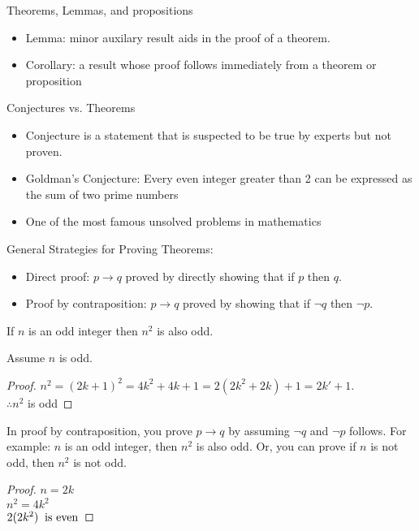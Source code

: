 \documentclass[8pt]{scrreprt}
\begin{document}
\begin{landscape}
\begin{multicols*}{3}
Theorems, Lemmas, and propositions

\begin{itemize}
	\item Lemma: minor auxilary result aids in the proof of a theorem.
	\item Corollary: a result whose proof follows immediately from a theorem or proposition
\end{itemize}

Conjectures vs. Theorems

\begin{itemize}
	\item Conjecture is a statement that is suspected to be true by experts but not proven.
	\item Goldman's Conjecture: Every even integer greater than 2 can be expressed as the sum of two prime numbers
	\item One of the most famous unsolved problems in mathematics
\end{itemize}

General Strategies for Proving Theorems:

\begin{itemize}
	\item Direct proof: $p\rightarrow q$ proved by directly showing that if $p$ then $q$.
	\item Proof by contraposition: $p\rightarrow q$ proved by showing that if $\neg q$ then $\neg p$.
\end{itemize}

\begin{example}
	If $n$ is an odd integer then $n^2$ is also odd.

	Assume $n$ is odd.

	\begin{proof}
		$n^2=(2k+1)^2=4k^2+4k+1=2(2k^2+2k) + 1 = 2k' + 1$. \\
		$\therefore n^2$ is odd
	\end{proof}
\end{example}

\begin{example}
	In proof by contraposition, you prove $p\rightarrow q$ by assuming $\neg q$ and
	$\neg p$ follows. For example: $n$ is an odd integer, then $n^2$ is also odd. Or, you can prove
	if $n$ is not odd, then $n^2$ is not odd.

	\begin{proof}
		$n = 2k$ \\
		$n^2 = 4k^2$ \\
		$2(2k^2) \text{\: is even}$
	\end{proof}
\end{example}


\end{multicols*}
\end{landscape}
\end{document}
